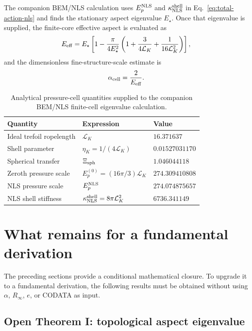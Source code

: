 \documentclass[11pt]{article}
\newcommand{\EpNLS}{E_p^{\rm NLS}}
\newcommand{\kappaNLS}{\kappa_{\rm NLS}^{\rm shell}}
\begin{document}
The companion BEM/NLS calculation uses \(\EpNLS\) and \(\kappaNLS\) in
Eq.~\eqref{eq:total-action-nls} and finds the stationary aspect eigenvalue \(E_\star\).  Once
that eigenvalue is supplied, the finite-core effective aspect is evaluated as
\begin{equation}
  E_{\rm eff}
  =
  E_\star
  \left[
  1-
  \frac{\pi}{4E_\star^2}
  \left(
  1+\frac{3}{4\mathcal L_K}+\frac{1}{16\mathcal L_K^2}
  \right)
  \right],
  \label{eq:Eeff-star}
\end{equation}
and the dimensionless fine-structure-scale estimate is
\begin{equation}
  \alpha_{\rm cell}=\frac{2}{E_{\rm eff}}.
  \label{eq:alpha-star}
\end{equation}

\begin{table}[h]
\centering
\caption{Analytical pressure-cell quantities supplied to the companion BEM/NLS finite-cell eigenvalue calculation.}
\begin{tabular}{@{}lll@{}}
\toprule
Quantity & Expression & Value \\
\midrule
Ideal trefoil ropelength & \(\mathcal L_K\) & \(16.371637\) \\
Shell parameter & \(\eta_K=1/(4\mathcal L_K)\) & \(0.01527031170\) \\
Spherical transfer & \(\Xi_{\rm sph}\) & \(1.046044118\) \\
Zeroth pressure scale & \(E_p^{(0)}=(16\pi/3)\mathcal L_K\) & \(274.309410808\) \\
NLS pressure scale & \(\EpNLS\) & \(274.074875657\) \\
NLS shell stiffness & \(\kappaNLS=8\pi\mathcal L_K^2\) & \(6736.341149\) \\
\bottomrule
\end{tabular}
\label{tab:nls-pressure}
\end{table}

\section{What remains for a fundamental derivation}
\label{sec:fundamental}

The preceding sections provide a conditional mathematical closure.  To upgrade it to a
fundamental derivation, the following results must be obtained without using \(\alpha\),
\(R_\infty\), \(e\), or CODATA as input.

\subsection{Open Theorem I: topological aspect eigenvalue}
\end{document}
